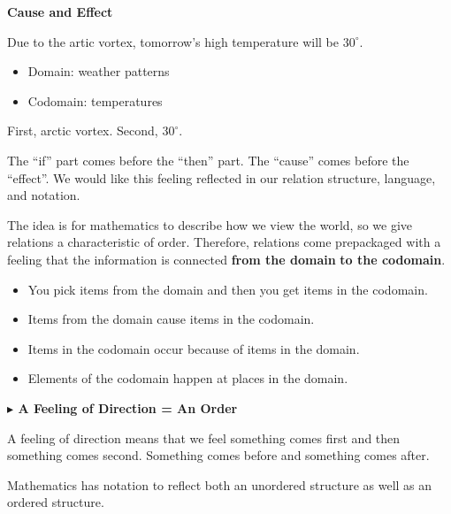 \documentclass{ximera}
\begin{document}
\begin{idea} \textbf{\textcolor{blue!55!black}{Cause and Effect}}

Due to the artic vortex, tomorrow's high temperature will be $30^{\circ}$. 

\begin{itemize}
    \item Domain: weather patterns
    \item Codomain: temperatures
\end{itemize}

First, arctic vortex. Second, $30^{\circ}$.

\end{idea}

The ``if'' part comes before the ``then'' part.  The ``cause'' comes before the ``effect''.  We would like this feeling reflected in our relation structure, language, and notation.  


The idea is for mathematics to describe how we view the world, so we give relations a characteristic of order. Therefore, relations come prepackaged with a feeling that the information is connected \textbf{\textcolor{purple!85!blue}{from the domain}} \textbf{\textcolor{blue!55!black}{to the codomain}}.






\begin{itemize}
\item You pick items from the domain and then you get items in the codomain.
\item Items from the domain cause items in the codomain.
\item Items in the codomain occur because of items in the domain.
\item Elements of the codomain happen at places in the domain.
\end{itemize}




\textbf{\textcolor{red!70!black}{$\blacktriangleright$ A Feeling of Direction = An Order}}

A feeling of direction means that we feel something comes first and then something comes second.  Something comes before and something comes after. 


Mathematics has notation to reflect both an unordered structure as well as an ordered structure. 
\end{document}
